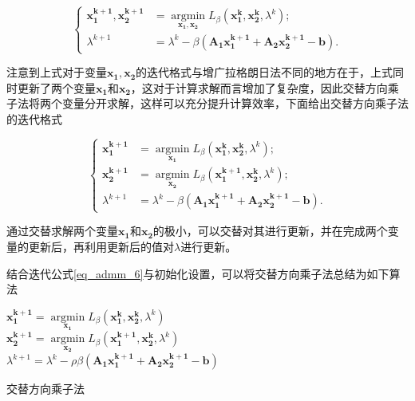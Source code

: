 \begin{equation}
    \begin{cases}
        \bm{x_{1}^{k+1}, x_{2}^{k+1}} &= \mathop{\mathrm{argmin}}\limits_{\bm{x_{1}, x_{2}}} L_{\beta}(\bm{x_{1}^{k}, x_{2}^{k}}, \lambda^{k}); \\
        \lambda^{k+1} &= \lambda^{k} - \beta (\bm{A_{1}x_{1}^{k+1} + A_{2}x_{2}^{k+1} - b}).
    \end{cases}
\end{equation}

注意到上式对于变量$\bm{x_{1}, x_{2}}$的迭代格式与增广拉格朗日法不同的地方在于，上式同时更新了两个变量$\bm{x_{1}}$和$\bm{x_{2}}$，这对于计算求解而言增加了复杂度，因此交替方向乘子法将两个变量分开求解，这样可以充分提升计算效率，下面给出交替方向乘子法的迭代格式

\begin{equation}\label{eq_admm_6}
    \begin{cases}
        \bm{x_{1}^{k+1}} &= \mathop{\mathrm{argmin}}\limits_{\bm{x_{1}}} L_{\beta}(\bm{x_{1}^{k}, x_{2}^{k}}, \lambda^{k}) ; \\
        \bm{x_{2}^{k+1}} &= \mathop{\mathrm{argmin}}\limits_{\bm{x_{2}}} L_{\beta}(\bm{x_{1}^{k+1}, x_{2}^{k}}, \lambda^{k}) ; \\
        \lambda^{k+1} &= \lambda^{k} - \beta (\bm{A_{1}x_{1}^{k+1} + A_{2}x_{2}^{k+1} - b}).
    \end{cases}
\end{equation}

通过交替求解两个变量$\bm{x_{1}}$和$\bm{x_{2}}$的极小，可以交替对其进行更新，并在完成两个变量的更新后，再利用更新后的值对$\lambda$进行更新。

结合迭代公式\ref{eq_admm_6}与初始化设置，可以将交替方向乘子法\cite{2017ADMM}总结为如下算法

\begin{algorithm}\label{alg_admm_2}

    \SetAlgoLined

     {
        $\bm{x_{1}^{k+1}} = \mathop{\mathrm{argmin}}\limits_{\bm{x_{1}}} L_{\beta}(\bm{x_{1}^{k}, x_{2}^{k}}, \lambda^{k})$  \\        
        
        $\bm{x_{2}^{k+1}} = \mathop{\mathrm{argmin}}\limits_{\bm{x_{2}}} L_{\beta}(\bm{x_{1}^{k+1}, x_{2}^{k}}, \lambda^{k})$  \\

        $\lambda^{k+1} = \lambda^{k} - \rho \beta (\bm{A_{1}x_{1}^{k+1} + A_{2}x_{2}^{k+1} - b})$
    }
    \caption{交替方向乘子法}
\end{algorithm}

